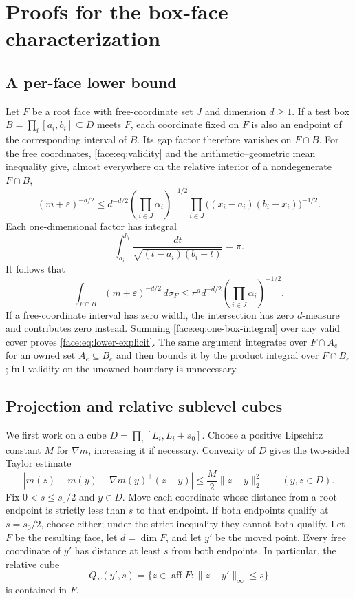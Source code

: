 \section{Proofs for the box-face characterization}
\label{app:face}

\subsection{A per-face lower bound}
\label{app:face:lower-bound}

Let $F$ be a root face with free-coordinate set $J$ and dimension
$d\ge1$.  If a test box $B=\prod_i[a_i,b_i]\subseteq D$ meets $F$,
each coordinate fixed on $F$ is also an endpoint of the corresponding
interval of $B$.  Its gap factor therefore vanishes on $F\cap B$.
For the free coordinates, \eqref{face:eq:validity} and the
arithmetic--geometric mean inequality give, almost everywhere on the
relative interior of a nondegenerate $F\cap B$,
\[
 (m+\varepsilon)^{-d/2}
 \le d^{-d/2}\left(\prod_{i\in J}\alpha_i\right)^{-1/2}
       \prod_{i\in J}\bigl((x_i-a_i)(b_i-x_i)\bigr)^{-1/2}.
\]
Each one-dimensional factor has integral
\[
 \int_{a_i}^{b_i}\frac{dt}{\sqrt{(t-a_i)(b_i-t)}}=\pi.
\]
It follows that
\begin{equation}
 \label{face:eq:one-box-integral}
 \int_{F\cap B}(m+\varepsilon)^{-d/2}\,d\sigma_F
 \le\pi^d d^{-d/2}
       \left(\prod_{i\in J}\alpha_i\right)^{-1/2}.
\end{equation}
If a free-coordinate interval has zero width, the intersection has
zero $d$-measure and contributes zero instead.  Summing
\eqref{face:eq:one-box-integral} over any valid cover proves
\eqref{face:eq:lower-explicit}.  The same argument integrates over
$F\cap A_e$ for an owned set $A_e\subseteq B_e$ and then bounds it
by the product integral over $F\cap B_e$; full validity on the
unowned boundary is unnecessary.

\subsection{Projection and relative sublevel cubes}
\label{app:face:projection}

We first work on a cube $D=\prod_i[L_i,L_i+s_0]$.
Choose a positive Lipschitz constant $M$ for $\nabla m$, increasing
it if necessary.  Convexity of $D$ gives the two-sided Taylor estimate
\begin{equation}
 \label{face:eq:descent}
 \left|m(z)-m(y)-\nabla m(y)^\top(z-y)\right|
 \le\frac M2\|z-y\|_2^2\qquad(y,z\in D).
\end{equation}
Fix $0<s\le s_0/2$ and $y\in D$.  Move each coordinate whose
distance from a root endpoint is strictly less than $s$ to that
endpoint.  If both endpoints qualify at $s=s_0/2$, choose either;
under the strict inequality they cannot both qualify.  Let $F$ be
the resulting face, let $d=\dim F$, and let $y'$ be the moved point.
Every free coordinate of $y'$ has distance at least $s$ from both
endpoints.  In particular, the relative cube
\[
 Q_F(y',s)=\{z\in\operatorname{aff}F:
                 \|z-y'\|_\infty\le s\}
\]
is contained in $F$.

